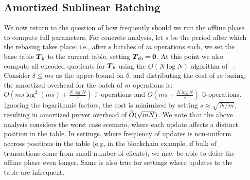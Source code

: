 \subsection{Amortized Sublinear Batching}\label{sec:amortization}
We now return to the question of how frequently should we run the offline phase to compute full parameters.
For concrete analysis, let $s$ be the period after which the rebasing takes place; i.e., after $s$ batches of $m$ operations
each, we set the base table $\vecTbase$ to the current table, setting $\vecTcache=\vec{0}$. At this point we also compute all
encoded quotients for $\vecTbase$ using the $O(N\log N)$ algorithm of ~\cite{EPRINT:FeiKho23}. Consider $\delta\leq ms$ as
the upper-bound on $\delta$, and distributing the cost of re-basing, the amortized overhead for the batch of $m$ operations is:
$O(ms \log^2(ms)+\frac{N\log N}{s})$ $\mathbb{F}$-operations and $O(ms +\frac{N\log N}{s})$ $\mathbb{G}$-operations. Ignoring
the logarithmic factors, the cost is minimized by setting $s\approx \sqrt{N/m}$, resulting in amortized prover overhead of
$\widetilde{O}(\sqrt{mN})$. We note that the above analysis considers the worst case scenario, where each update affects a distinct
position in the table. In settings, where frequency of updates is non-uniform accross positions in the table (e.g, in the
blockchain example, if bulk of transactions come from small number of clients), we may be able to defer the offline phase even longer.
Same is also true for settings where updates to the table are infrequent.